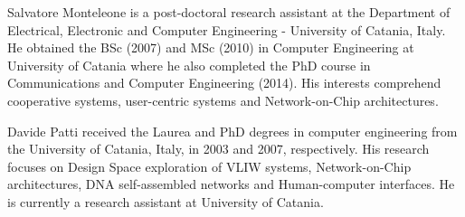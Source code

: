 \documentclass[preprint]{elsarticle}
\begin{document}
Salvatore Monteleone is a post-doctoral research assistant at the
Department of Electrical, Electronic and Computer Engineering -
University of Catania, Italy. He obtained the BSc (2007) and MSc
(2010) in Computer Engineering at University of Catania where he also
completed the PhD course in Communications and Computer Engineering
(2014). His interests comprehend cooperative systems, user-centric
systems and Network-on-Chip architectures.

Davide Patti received the Laurea and PhD degrees in computer
engineering from the University of Catania, Italy, in 2003 and 2007,
respectively. His research focuses on Design Space exploration of VLIW
systems, Network-on-Chip architectures, DNA self-assembled networks
and Human-computer interfaces. He is currently a research assistant
at University of Catania.
\end{document}
